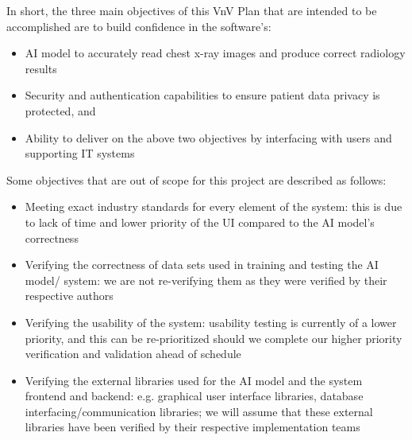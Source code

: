 \documentclass[12pt, titlepage]{article}
\begin{document}
\noindent In short, the three main objectives of this VnV Plan that are intended to be accomplished are to build confidence in the software's:
\begin{itemize}
    \item AI model to accurately read chest x-ray images and produce correct radiology results
    \item Security and authentication capabilities to ensure patient data privacy is protected, and
    \item Ability to deliver on the above two objectives by interfacing with users and supporting IT systems
\end{itemize}

\noindent Some objectives that are out of scope for this project are described as follows:
\begin{itemize}
    \item Meeting exact industry standards for every element of the system: this is due to lack of time and lower priority of the UI compared to the AI model's correctness
    \item Verifying the correctness of data sets used in training and testing the AI model/ system: we are not re-verifying them as they were verified by their respective authors
    \item Verifying the usability of the system: usability testing is currently of a lower priority, and this can be re-prioritized should we complete our higher priority verification and validation ahead of schedule
    \item Verifying the external libraries used for the AI model and the system frontend and backend: e.g. graphical user interface libraries, database interfacing/communication libraries; we will assume that these external libraries have been verified by their respective implementation teams
\end{itemize}
\end{document}
